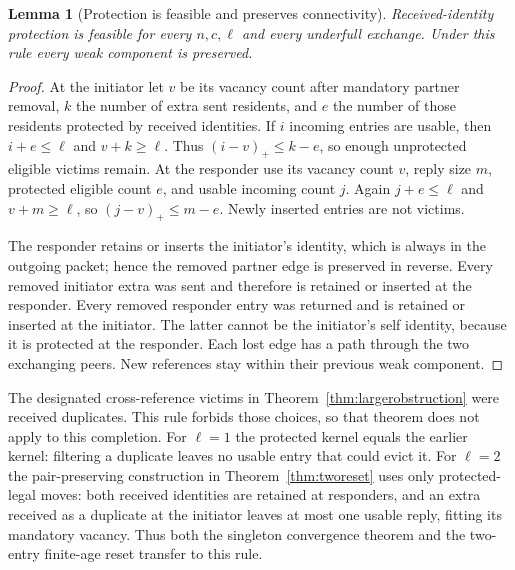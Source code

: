 \documentclass[11pt]{article}
\newtheorem{lemma}[theorem]{Lemma}
\begin{document}
\begin{lemma}[Protection is feasible and preserves connectivity]
\label{lem:receiveprotect}
Received-identity protection is feasible for every $n,c,\ell$
and every underfull exchange. Under this rule every weak
component is preserved.
\end{lemma}
\begin{proof}
At the initiator let $v$ be its vacancy count after mandatory
partner removal, $k$ the number of extra sent residents, and
$e$ the number of those residents protected by received
identities. If $i$ incoming entries are usable, then
$i+e\le\ell$ and $v+k\ge\ell$.
Thus $(i-v)_+\le k-e$, so enough unprotected eligible
victims remain. At the responder use its vacancy count $v$,
reply size $m$, protected eligible count $e$, and usable
incoming count $j$. Again $j+e\le\ell$ and $v+m\ge\ell$,
so $(j-v)_+\le m-e$. Newly inserted entries are not victims.

The responder retains or inserts the initiator's identity,
which is always in the outgoing packet; hence the removed
partner edge is preserved in reverse.
Every removed initiator extra was sent and therefore is
retained or inserted at the responder.
Every removed responder entry was returned and is retained
or inserted at the initiator. The latter cannot be the
initiator's self identity, because it is protected at the
responder. Each lost edge has a path through the two
exchanging peers. New references stay within their previous
weak component.
\end{proof}

The designated cross-reference victims in
Theorem~\ref{thm:largerobstruction} were received duplicates.
This rule forbids those choices, so that theorem does not
apply to this completion.
For $\ell=1$ the protected kernel equals the earlier kernel:
filtering a duplicate leaves no usable entry that could evict it.
For $\ell=2$ the pair-preserving construction in
Theorem~\ref{thm:tworeset} uses only protected-legal moves:
both received identities are retained at responders, and an
extra received as a duplicate at the initiator leaves at most
one usable reply, fitting its mandatory vacancy.
Thus both the singleton convergence theorem and the two-entry
finite-age reset transfer to this rule.
\end{document}
